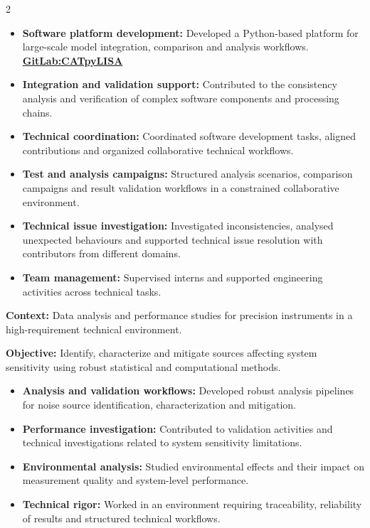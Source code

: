 \documentclass[8pt,a4paper,ragged2e,withhyper]{../_shared/altacv}
\begin{document}
\begin{paracol}{2}
\begin{itemize}
\item \textbf{Software platform development:} Developed a Python-based platform for large-scale model integration, comparison and analysis workflows. \textcolor{DarkPastelRed}{\href{https://gitlab.oca.eu/gboileau/lisa_l3_tools}{\bf GitLab:CATpyLISA}}
\item \textbf{Integration and validation support:} Contributed to the consistency analysis and verification of complex software components and processing chains.
\item \textbf{Technical coordination:} Coordinated software development tasks, aligned contributions and organized collaborative technical workflows.
\item \textbf{Test and analysis campaigns:} Structured analysis scenarios, comparison campaigns and result validation workflows in a constrained collaborative environment.
\item \textbf{Technical issue investigation:} Investigated inconsistencies, analysed unexpected behaviours and supported technical issue resolution with contributors from different domains.
\item \textbf{Team management:} Supervised interns and supported engineering activities across technical tasks.
\end{itemize}

\divider


\textbf{Context:} Data analysis and performance studies for precision instruments in a high-requirement technical environment.

\textbf{Objective:} Identify, characterize and mitigate sources affecting system sensitivity using robust statistical and computational methods.

\begin{itemize}
\item \textbf{Analysis and validation workflows:} Developed robust analysis pipelines for noise source identification, characterization and mitigation.
\item \textbf{Performance investigation:} Contributed to validation activities and technical investigations related to system sensitivity limitations.
\item \textbf{Environmental analysis:} Studied environmental effects and their impact on measurement quality and system-level performance.
\item \textbf{Technical rigor:} Worked in an environment requiring traceability, reliability of results and structured technical workflows.
\end{itemize}


\end{paracol}
\end{document}
